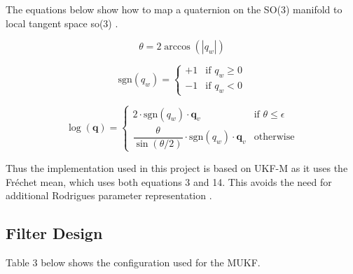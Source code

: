 The equations below show how to map a quaternion on the SO(3) manifold to local tangent space so(3) \cite{sol_2017_quaternion}. 

\begin{equation}
    \theta = 2\arccos\left(\left|q_w\right|\right)
\end{equation}

\begin{equation}
    \text{sgn}(q_w) = \begin{cases} +1 & \text{if } q_w \geq 0 \\ -1 & \text{if } q_w < 0 \end{cases}
\end{equation}

\begin{equation}
    \log(\mathbf{q}) = \begin{cases} 2 \cdot \text{sgn}(q_w) \cdot \mathbf{q}_{v} & \text{if } \theta \leq \epsilon \\ \dfrac{\theta}{\sin(\theta / 2)} \cdot \text{sgn}(q_w) \cdot \mathbf{q}_{v} & \text{otherwise} \end{cases}
\end{equation}




Thus the implementation used in this project is based on UKF-M as it uses the Fréchet mean, which uses both equations 3 and 14. This avoids the need for additional Rodrigues parameter
representation \cite{brossard_2020_a} \cite{crassidis_unscented}.
\subsection{Filter Design}
Table 3 below shows the configuration used for the MUKF. 

